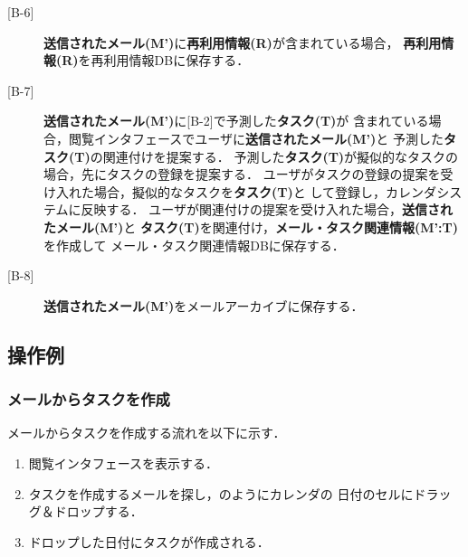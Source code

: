 \documentclass[submit,techreq,noauthor,dvipdfmx]{ipsj}
\begin{document}
\begin{description}
\item[[B-6\textrm{]}] {\bf 送信されたメール(M')}に{\bf 再利用情報(R)}が含まれている場合，
  {\bf 再利用情報(R)}を再利用情報DBに保存する．

\item[[B-7\textrm{]}] {\bf 送信されたメール(M')}に[B-2]で予測した{\bf タスク(T)}が
  含まれている場合，閲覧インタフェースでユーザに{\bf 送信されたメール(M')}と
  予測した{\bf タスク(T)}の関連付けを提案する．
  予測した{\bf タスク(T)}が擬似的なタスクの場合，先にタスクの登録を提案する．
  ユーザがタスクの登録の提案を受け入れた場合，擬似的なタスクを{\bf タスク(T)}と
  して登録し，カレンダシステムに反映する．
  ユーザが関連付けの提案を受け入れた場合，{\bf 送信されたメール(M')}と
  {\bf タスク(T)}を関連付け，{\bf メール・タスク関連情報(M':T)}を作成して
  メール・タスク関連情報DBに保存する．

\item[[B-8\textrm{]}] {\bf 送信されたメール(M')}をメールアーカイブに保存する．

\end{description}


\subsection{操作例}\label{sec:example_of_use}

\subsubsection{メールからタスクを作成}\label{sec:use_example1}


メールからタスクを作成する流れを以下に示す．

\begin{enumerate}
\item 閲覧インタフェースを表示する．
\item タスクを作成するメールを探し，のようにカレンダの
  日付のセルにドラッグ＆ドロップする．
\item ドロップした日付にタスクが作成される．
\end{enumerate}
\end{document}
